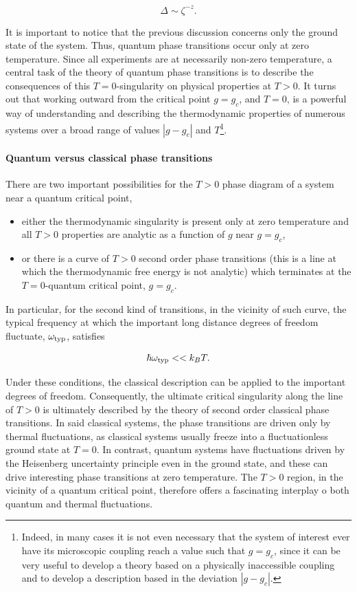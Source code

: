 \documentclass{homework}
\begin{document}
$$
    \Delta \sim \zeta^{-z}.
$$

It is important to notice that the previous discussion concerns only the ground state of the system. Thus, quantum phase transitions occur only at zero temperature. Since all experiments are at necessarily non-zero temperature, a central task of the theory of quantum phase transitions is to describe the consequences of this $T=0$-singularity on physical properties at $T > 0$. It turns out that working outward from the critical point $g = g_c$, and $T=0$, is a powerful way of understanding and describing the thermodynamic properties of numerous systems over a broad range of values $|g-g_c|$ and $T$\footnote{Indeed, in many cases it is not even necessary that the system of interest ever have its microscopic coupling reach a value such that $g=g_c$, since it can be very useful to develop a theory based on a physically inaccessible coupling and to develop a description based in the deviation $|g- g_c|.$}. \\

\paragraph{\textbf{Quantum versus classical phase transitions}}

There are two important possibilities for the $T > 0$ phase diagram of a system near a quantum critical point, 
\begin{itemize}
    \item either the thermodynamic singularity is present only at zero temperature and all $T>0$ properties are analytic as a function of $g$ near $g = g_c$,
    \item or there is a curve of $T>0$ second order phase transitions (this is a line at which the thermodynamic free energy is not analytic) which terminates at the $T=0$-quantum critical point, $g = g_c$.
\end{itemize}

In particular, for the second kind of transitions, in the vicinity of such curve, the typical frequency at which the important long distance degrees of freedom fluctuate, $\omega_{\textnormal{typ}}$, satisfies 

$$
\hbar \omega_{\textnormal{typ}} << k_B T.
$$

Under these conditions, the classical description can be applied to the important degrees of freedom. Consequently, the ultimate critical singularity along the line of $T>0$ is ultimately described by the theory of second order classical phase transitions. In said classical systems, the phase transitions are driven only by thermal fluctuations, as classical systems usually freeze into a fluctuationless ground state at $T=0$. In contrast, quantum systems have fluctuations driven by the Heisenberg uncertainty principle even in the ground state, and these can drive interesting phase transitions at zero temperature. The $T>0$ region, in the vicinity of a quantum critical point, therefore offers a fascinating interplay o both quantum and thermal fluctuations. 
\end{document}
